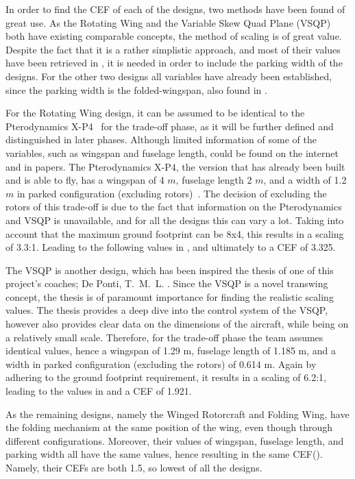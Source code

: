 In order to find the CEF of each of the designs, two methods have been found of great use.
As the Rotating Wing and the Variable Skew Quad Plane (VSQP) both have existing comparable concepts, the method of scaling is of great value.
Despite the fact that it is a rather simplistic approach, and most of their values have been retrieved in , it is needed in order to include the parking width of the designs.
For the other two designs all variables have already been established, since the parking width is the folded-wingspan, also found in .

For the Rotating Wing design, it can be assumed to be identical to the Pterodynamics X-P4~\cite{pterodynamics_site} for the trade-off phase, as it will be further defined and distinguished in later phases.
Although limited information of some of the variables, such as wingspan and fuselage length, could be found on the internet and in papers.
The Pterodynamics X-P4, the version that has already been built and is able to fly, has a wingspan of 4 $m$, fuselage length 2 $m$, and a width of 1.2 $m$ in parked configuration (excluding rotors)~\cite{pterodynamics_site,pterodynamics_art}.
The decision of excluding the rotors of this trade-off is due to the fact that information on the Pterodynamics and VSQP is unavailable, and for all the designs this can vary a lot.
Taking into account that the maximum ground footprint can be 8x4, this results in a scaling of 3.3:1.
Leading to the following values in , and ultimately to a CEF of 3.325.

The VSQP is another design, which has been inspired the thesis of one of this project’s coaches; De Ponti, T. M. L. \cite{ThesisVSQP}.
Since the VSQP is a novel transwing concept, the thesis is of paramount importance for finding the realistic scaling values.
The thesis provides a deep dive into the control system of the VSQP, however also provides clear data on the dimensions of the aircraft, while being on a relatively small scale.
Therefore, for the trade-off phase the team assumes identical values, hence a wingspan of 1.29 m, fuselage length of 1.185 m, and a width in parked configuration (excluding the rotors) of 0.614 m.
Again by adhering to the ground footprint requirement, it results in a scaling of 6.2:1, leading to the values in  and a CEF of 1.921.

As the remaining designs, namely the Winged Rotorcraft and Folding Wing, have the folding mechanism at the same position of the wing, even though through different configurations. Moreover, their values of wingspan, fuselage length, and parking width all have the same values, hence resulting in the same CEF(). Namely, their CEFs are both 1.5, so lowest of all the designs.

